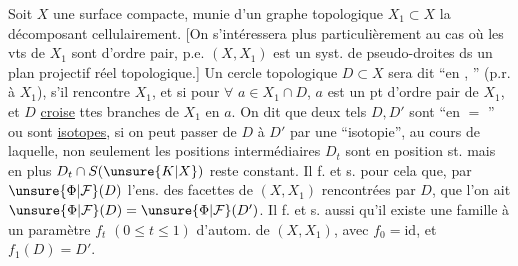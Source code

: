 Soit $X$ une surface compacte, munie
d'un graphe topologique $X_1\subset X$ la
décomposant cellulairement. [On s'intéressera
plus particulièrement au cas où
 les vts de $X_1$ sont d'ordre pair, p.e.
$(X,X_1)$ est un syst. de pseudo-droites
ds un plan  projectif réel topologique.]
 Un cercle topologique $D\subset X$ sera dit
``en , '' (p.r. à $X_1$), s'il
 rencontre $X_1$, et si pour $\forall$
$a\in X_1\cap D$,  $a$ est un
pt d'ordre pair de $X_1$, et $D$ \uline{croise} ttes
branches de $X_1$ en $a$. On dit que deux
tels $D,D'$ sont ``en $=$ ''
ou sont \uline{isotopes}, si on peut passer
de $D$ à $D'$ par une ``isotopie'', au cours
de laquelle, non seulement les positions
intermédiaires $D_t$ sont en position st.
mais en plus $D_t\cap S(\unsure{K|X})$ reste constant.
Il f. et s. pour cela que,   par
$\unsure{\Phi|\mathcal F}(D)$ l'ens. des facettes de $(X,X_1)$ rencontrées
par $D$, que l'on ait $\unsure{\Phi|\mathcal F}(D)=\unsure{\Phi|\mathcal F}(D')$. Il f. et s.
aussi qu'il existe une famille à un
paramètre $f_t$ $(0\leq t\leq1)$ d'autom. de
$(X,X_1)$, avec $f_0=\mathrm{id}$, et $f_1(D)=D'$.


